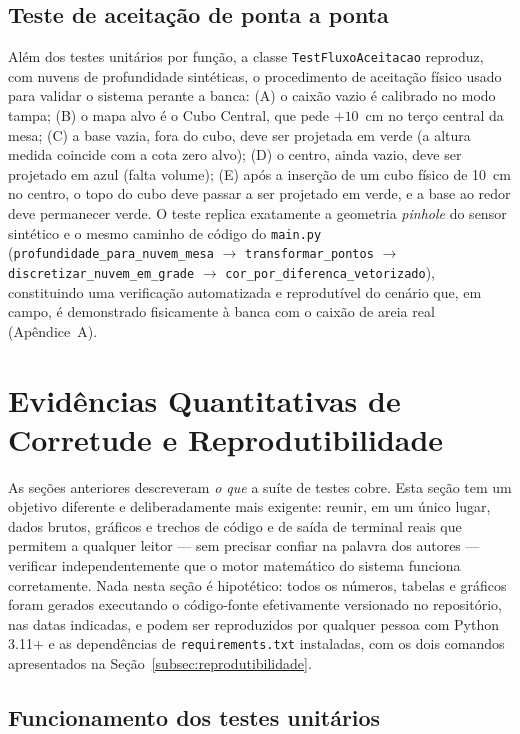 \subsection{Teste de aceitação de ponta a ponta}
\label{sec:aceitacao}

Além dos testes unitários por função, a classe
\texttt{TestFluxoAceitacao} reproduz, com nuvens de profundidade
sintéticas, o procedimento de aceitação físico usado para
validar o sistema perante a banca: (A) o caixão vazio é calibrado no
modo tampa; (B) o mapa alvo é o Cubo Central, que pede $+10$~cm no
terço central da mesa; (C) a base vazia, fora do cubo, deve ser
projetada em verde (a altura medida coincide com a cota zero
alvo); (D) o centro, ainda vazio, deve ser projetado em azul
(falta volume); (E) após a inserção de um cubo físico de 10~cm no
centro, o topo do cubo deve passar a ser projetado em verde, e
a base ao redor deve permanecer verde. O teste replica exatamente a
geometria \textit{pinhole} do sensor sintético e o mesmo caminho de
código do \texttt{main.py} (\texttt{profundidade\_para\_nuvem\_mesa}
$\to$ \texttt{transformar\_pontos} $\to$
\texttt{discretizar\_nuvem\_em\_grade} $\to$
\texttt{cor\_por\_diferenca\_vetorizado}), constituindo uma verificação
automatizada e reprodutível do cenário que, em campo, é demonstrado
fisicamente à banca com o caixão de areia real (Apêndice~A).

\section{Evidências Quantitativas de Corretude e Reprodutibilidade}
\label{sec:evidencias}

As seções anteriores descreveram \emph{o que} a suíte de testes cobre.
Esta seção tem um objetivo diferente e deliberadamente mais exigente:
reunir, em um único lugar, dados brutos, gráficos e trechos de código e
de saída de terminal reais que permitem a qualquer leitor
— sem precisar confiar na palavra dos autores — verificar
independentemente que o motor matemático do sistema funciona
corretamente. Nada nesta seção é hipotético: todos os números, tabelas
e gráficos foram gerados executando o código-fonte efetivamente
versionado no repositório, nas datas indicadas, e podem ser
reproduzidos por qualquer pessoa com Python 3.11+ e as dependências de
\texttt{requirements.txt} instaladas, com os dois comandos apresentados
na Seção~\ref{subsec:reprodutibilidade}.

\subsection{Funcionamento dos testes unitários}
\label{subsec:unitarios}

